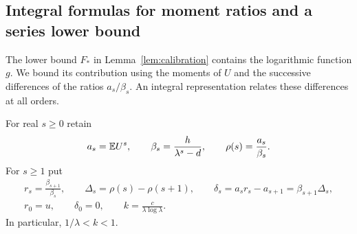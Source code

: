 \subsection{Integral formulas for moment ratios and a series lower bound}
\label{subsec:marker-floor}
The lower bound $F_*$ in Lemma~\ref{lem:calibration} contains the
logarithmic function $g$. We bound its contribution using the moments
of $U$ and the successive differences of the ratios $a_s/\beta_s$.
An integral representation relates these differences at all orders.

For real $s\ge0$ retain
\[
 a_s=\mathbb E U^s,\qquad \beta_s=\frac{h}{\lambda^s-d},\qquad
 \rho(s)=\frac{a_s}{\beta_s}.
\]
For $s\ge1$ put
\begin{equation}\label{eq:marker-deficits}
 \begin{gathered}
 r_s=\frac{\beta_{s+1}}{\beta_s},\qquad
 \Delta_s=\rho(s)-\rho(s+1),\qquad
 \delta_s=a_s r_s-a_{s+1}=\beta_{s+1}\Delta_s,\\
 r_0=u,\qquad \delta_0=0,\qquad
 k=\frac{c}{\lambda\log\lambda}.
 \end{gathered}
\end{equation}
In particular, $1/\lambda<k<1$.

